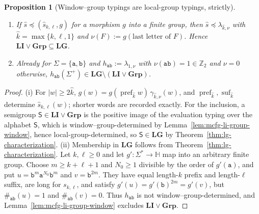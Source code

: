 \documentclass[11pt]{article}
\numberwithin{equation}{section}
\theoremstyle{plain}
\newtheorem{proposition}[theorem]{Proposition}
\theoremstyle{definition}
\theoremstyle{remark}
\begin{document}
\begin{proposition}[Window--group typings are local-group typings, strictly]
\label{prop:li-g-strict}
\begin{enumerate}[label=\textup{(\roman*)},leftmargin=*]
\item If $\widehat s\preceq(\widehat s_{k,\ell},g)$ for a morphism $g$ into a finite
group, then $\widehat s\preceq\lambda_{\hat k,\nu}$ with $\hat k=\max\{k,\ell,1\}$ and
$\nu(F):=g(\text{last letter of }F)$.  Hence $\mathbf{LI}\vee\mathbf{Grp}\subseteq\mathbf{LG}$.
\item Already for $\Sigma=\{\mathtt a,\mathtt b\}$ and
$h_{\mathtt{ab}}:=\lambda_{1,\nu}$ with
$\nu(\mathtt{ab})=1\in\mathbb Z_2$ and $\nu=0$ otherwise,
$h_{\mathtt{ab}}(\Sigma^+)\in\mathbf{LG}\setminus(\mathbf{LI}\vee\mathbf{Grp})$.
\end{enumerate}
\end{proposition}

\begin{proof}
(i) For $|w|\ge2\hat k$, $g(w)=g(\operatorname{pref}_{\hat k}w)\,\gamma_{\hat k,\nu}(w)$,
and $\operatorname{pref}_{\hat k},\operatorname{suf}_{\hat k}$ determine
$\widehat s_{k,\ell}(w)$; shorter words are recorded exactly.  For the inclusion, a
semigroup $\mathsf S\in\mathbf{LI}\vee\mathbf{Grp}$ is the positive image of the evaluation
typing over the alphabet $\mathsf S$, which is window--group-determined by
Lemma~\ref{lem:mcfg-li-group-window}, hence local-group-determined, so
$\mathsf S\in\mathbf{LG}$ by Theorem~\ref{thm:lg-characterization}.
(ii) Membership in $\mathbf{LG}$ follows from
Theorem~\ref{thm:lg-characterization}.  Let $k,\ell\ge0$ and let
$g':\Sigma^*\to {\mathbb H}$ map into an arbitrary finite group.  Choose
$m\ge k+\ell+1$ and $N_0\ge1$ divisible by the order of $g'(\mathtt a)$,
and put $u=\mathtt b^m\mathtt a^{N_0}\mathtt b^m$ and
$v=\mathtt b^{2m}$.  They have equal length-$k$ prefix and
length-$\ell$ suffix, are long for $s_{k,\ell}$, and satisfy
$g'(u)=g'(\mathtt b)^{2m}=g'(v)$, but
$\#_{\mathtt{ab}}(u)=1$ and $\#_{\mathtt{ab}}(v)=0$.
Thus $h_{\mathtt{ab}}$ is not window--group-determined, and
Lemma~\ref{lem:mcfg-li-group-window} excludes
$\mathbf{LI}\vee\mathbf{Grp}$.
\end{proof}
\end{document}
